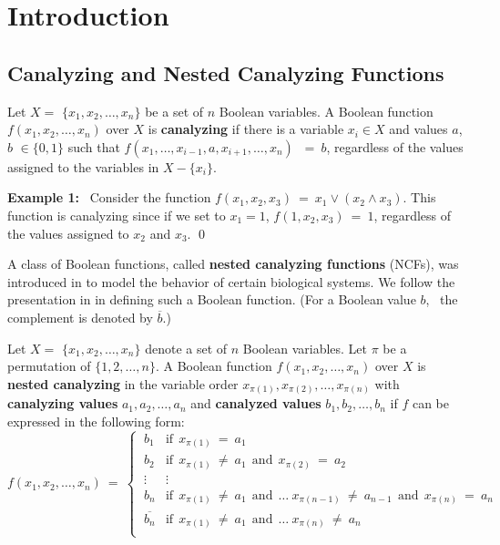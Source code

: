 \section{Introduction} 
\label{sec:intro}


\subsection{Canalyzing and Nested Canalyzing Functions}
\label{sse:ncf_def}

\begin{definition}\label{def:canalyzing}
Let $X = $ $\{x_1, x_2, \ldots, x_n\}$ be a set of $n$  Boolean variables.
A Boolean function $f(x_1, x_2, \ldots, x_n)$ over $X$ is \textbf{canalyzing}
if there is a variable $x_i \in X$ and values $a$, $b$ $\in \{0,1\}$ such that 
$f(x_1, \ldots, x_{i-1}, a, x_{i+1}, \ldots, x_n)$ $~=~ b$, regardless of the values
assigned to the variables in $X - \{x_i\}$.
\end{definition}

\medskip

\noindent
\textbf{Example 1:}~ Consider the function 
$f(x_1, x_2, x_3) ~=~ x_1 \vee (x_2 \wedge x_3)$.
This function is canalyzing since if we set to $x_1 = 1$,
$f(1, x_2, x_3) ~=~ 1$, regardless of the values assigned to $x_2$ and $x_3$. \qed

\medskip

A class of Boolean functions, called \textbf{nested canalyzing functions} (NCFs),
was introduced in \cite{Kauffman-etal-2003} to model the behavior of
certain biological systems.
We follow the presentation in \cite{Layne-2011} in defining 
such a Boolean function. 
(For a Boolean value $b$,~ the complement is denoted by $\overline{b}$.)

\begin{definition}\label{def:nested_canalyzing}
Let $X = $ $\{x_1, x_2, \ldots, x_n\}$ denote a set of $n$  Boolean variables.
Let $\pi$ be a permutation of $\{1, 2, \ldots, n\}$.
A Boolean function $f(x_1, x_2, \ldots, x_n)$ over $X$ is \textbf{nested canalyzing}
in the variable order $x_{\pi(1)}, x_{\pi(2)}, \ldots, x_{\pi(n)}$ with
\textbf{canalyzing values} $a_1, a_2, \ldots, a_n$ and 
\textbf{canalyzed values} $b_1, b_2, \ldots, b_n$ 
if $f$ can be expressed in the following form:
\[
f(x_1, x_2, \ldots, x_n) ~=~ 
   \begin{cases}
       \:b_1 & \mathrm{if~~} x_{\pi(1)} ~=~ a_1 \\
       \:b_2 & \mathrm{if~~} x_{\pi(1)} ~\neq~ a_1 \mathrm{~~and~~}
            x_{\pi(2)} ~=~ a_2 \\
       \:\vdots & \vdots \\
       \:b_n & \mathrm{if~~} x_{\pi(1)} ~\neq~ a_1 \mathrm{~~and~~} \ldots~
             x_{\pi(n-1)} ~\neq~ a_{n-1} \mathrm{~~and~~} x_{\pi(n)} ~=~ a_n \\
       \:\overline{b_n} & \mathrm{if~~} x_{\pi(1)} ~\neq~ a_1 \mathrm{~~and~~} \ldots~
            x_{\pi(n)} ~\neq~ a_n \\
   \end{cases}
\]
\end{definition}

